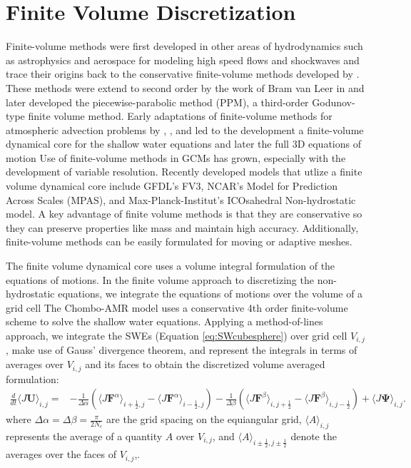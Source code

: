 \section{Finite Volume Discretization}
Finite-volume methods were first developed in 
other areas of hydrodynamics such as astrophysics 
and aerospace for modeling high speed flows and shockwaves and 
trace their origins back to the conservative finite-volume methods developed
by \cite{Godunov}. These methods were extend to second order by the work of Bram
van Leer in \cite{van Leer}
and later \cite{Collela} developed the piecewise-parabolic method (PPM), a third-order
Godunov-type finite volume method.
Early adaptations of finite-volume methods for atmospheric advection problems
by \cite {rood 1987}, \cite{Carpenter et al. (1990)}, and \cite{Allen1991} led to the development 
a finite-volume dynamical core for the shallow water equations \citep{Lin Rood} and later the full 3D
equations of motion \citep{Lin2004}
Use of finite-volume methods in GCMs has grown, especially with the development of variable resolution. Recently developed models that utlize a finite volume dynamical core include GFDL's FV3, NCAR's Model for Prediction Across Scales (MPAS), and Max-Planck-Institut's ICOsahedral Non-hydrostatic model.
A key advantage of finite volume methods is that they are conservative so they can preserve properties like mass and maintain high accuracy. Additionally, finite-volume methods can be easily formulated for moving or adaptive meshes.

  The finite volume dynamical core uses a volume integral formulation of the equations of motions. 
       In the finite volume approach to discretizing the non-hydrostatic equations, we integrate the equations of motions over the 
       volume of a grid cell
       The Chombo-AMR model uses a conservative 4th order finite-volume scheme to solve the shallow water equations.  Applying a method-of-lines approach, we integrate the SWEs (Equation \ref{eq:SWcubesphere}) over grid cell $V_{i,j}$, make use of Gauss' divergence theorem, and represent the integrals in terms of averages over $V_{i,j}$ and its faces to obtain the discretized volume averaged formulation: 
       \begin{align}
       \frac{d}{dt} \langle J \mathbf{U} \rangle_{i,j}
       = & - \frac{1}{\Delta \alpha} 
       \left( \langle J \mathbf{F}^\alpha \rangle_{i + \frac{1}{2},j} -
       \langle J \mathbf{F}^\alpha \rangle_{i - \frac{1}{2},j} \right)
      - \frac{1}{\Delta \beta}
      \left( \langle J \mathbf{F}^\beta \rangle_{i,j + \frac{1}{2}} -
      \langle J \mathbf{F}^\beta \rangle_{i,j - \frac{1}{2}} \right)
      + \langle J \mathbf{\Psi} \rangle_{i,j} .
      \label{eqn:PDEAveraged}
      \end{align}
 where $\Delta\alpha=\Delta\beta=\frac{\pi}{2N_c}$ are the grid spacing on the equiangular grid, $\langle A \rangle_{i,j}$ represents the average of a quantity $A$ over $V_{i,j}$, and $\langle A \rangle_{i \pm \frac{1}{2},j \pm \frac{1}{2}}$ denote the averages over the faces of $V_{i,j}$,.

